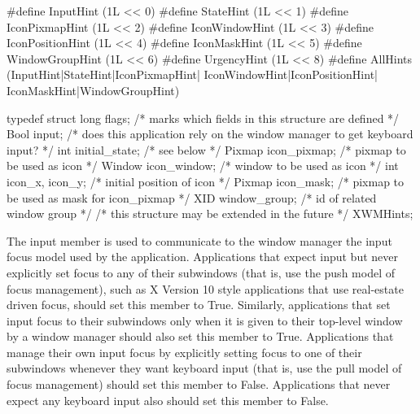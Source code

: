 \documentclass{report}
\begin{document}
\begin{itemize}
\begin{itemize}
\begin{cppcode}
                #define InputHint               (1L << 0)
                #define StateHint               (1L << 1)
                #define IconPixmapHint          (1L << 2)
                #define IconWindowHint          (1L << 3)
                #define IconPositionHint        (1L << 4)
                #define IconMaskHint            (1L << 5)
                #define WindowGroupHint         (1L << 6)
                #define UrgencyHint             (1L << 8)
                #define AllHints                (InputHint|StateHint|IconPixmapHint|
                                                IconWindowHint|IconPositionHint|
                                                IconMaskHint|WindowGroupHint)
            \end{cppcode}
            \bigbreak \noindent 
            \begin{cppcode}
                typedef struct {
                    long flags;                 /* marks which fields in this structure are defined */
                    Bool input;                 /* does this application rely on the window manager to get keyboard input? */
                    int initial_state;          /* see below */
                    Pixmap icon_pixmap;         /* pixmap to be used as icon */
                    Window icon_window;         /* window to be used as icon */
                    int icon_x, icon_y;         /* initial position of icon */
                    Pixmap icon_mask;           /* pixmap to be used as mask for icon_pixmap */
                    XID window_group;           /* id of related window group */
                    /* this structure may be extended in the future */
                } XWMHints;
            \end{cppcode}
            \bigbreak \noindent 
            The input member is used to communicate to the window manager the input focus model used by the application. Applications that expect input but never explicitly set focus to any of their subwindows (that is, use the push model of focus management), such as X Version 10 style applications that use real-estate driven focus, should set this member to True. Similarly, applications that set input focus to their subwindows only when it is given to their top-level window by a window manager should also set this member to True. Applications that manage their own input focus by explicitly setting focus to one of their subwindows whenever they want keyboard input (that is, use the pull model of focus management) should set this member to False. Applications that never expect any keyboard input also should set this member to False.

\end{itemize}
\end{itemize}
\end{document}
